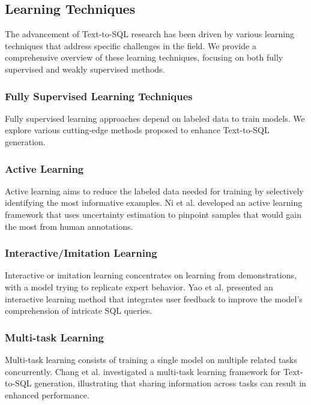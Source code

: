 \subsection{Learning Techniques}

The advancement of Text-to-SQL research has been driven by various learning techniques that address specific challenges in the field. We provide a comprehensive overview of these learning techniques, focusing on both fully supervised and weakly supervised methods.

\subsubsection{Fully Supervised Learning Techniques}

Fully supervised learning approaches depend on labeled data to train models. We explore various cutting-edge methods proposed to enhance Text-to-SQL generation.

\subsubsection*{Active Learning}

Active learning aims to reduce the labeled data needed for training by selectively identifying the most informative examples. Ni et al.\cite{ni2019merging} developed an active learning framework that uses uncertainty estimation to pinpoint samples that would gain the most from human annotations.

\subsubsection*{Interactive/Imitation Learning}

Interactive or imitation learning concentrates on learning from demonstrations, with a model trying to replicate expert behavior. Yao et al. \cite{yao-etal-2019-model} presented an interactive learning method that integrates user feedback to improve the model's comprehension of intricate SQL queries.

\subsubsection*{Multi-task Learning}

Multi-task learning consists of training a single model on multiple related tasks concurrently. Chang et al. \cite{chen2021leveraging} investigated a multi-task learning framework for Text-to-SQL generation, illustrating that sharing information across tasks can result in enhanced performance.

